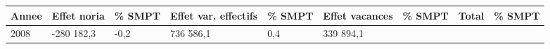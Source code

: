 \begin{longtable}[]{@{}lllllllll@{}}
\toprule
\begin{minipage}[b]{0.05\columnwidth}\raggedright
Annee\strut
\end{minipage} & \begin{minipage}[b]{0.10\columnwidth}\raggedright
Effet noria\strut
\end{minipage} & \begin{minipage}[b]{0.06\columnwidth}\raggedright
\% SMPT\strut
\end{minipage} & \begin{minipage}[b]{0.16\columnwidth}\raggedright
Effet var. effectifs\strut
\end{minipage} & \begin{minipage}[b]{0.06\columnwidth}\raggedright
\% SMPT\strut
\end{minipage} & \begin{minipage}[b]{0.12\columnwidth}\raggedright
Effet vacances\strut
\end{minipage} & \begin{minipage}[b]{0.06\columnwidth}\raggedright
\% SMPT\strut
\end{minipage} & \begin{minipage}[b]{0.10\columnwidth}\raggedright
Total\strut
\end{minipage} & \begin{minipage}[b]{0.06\columnwidth}\raggedright
\% SMPT\strut
\end{minipage}\tabularnewline
\midrule
\endhead
\begin{minipage}[t]{0.05\columnwidth}\raggedright
2008\strut
\end{minipage} & \begin{minipage}[t]{0.10\columnwidth}\raggedright
-280 182,3\strut
\end{minipage} & \begin{minipage}[t]{0.06\columnwidth}\raggedright
-0,2\strut
\end{minipage} & \begin{minipage}[t]{0.16\columnwidth}\raggedright
736 586,1\strut
\end{minipage} & \begin{minipage}[t]{0.06\columnwidth}\raggedright
0,4\strut
\end{minipage} & \begin{minipage}[t]{0.12\columnwidth}\raggedright
339 894,1\strut
\end{minipage} & \begin{minipage}[t]{0.06\columnwidth}\raggedright

\end{minipage}
\end{longtable}

